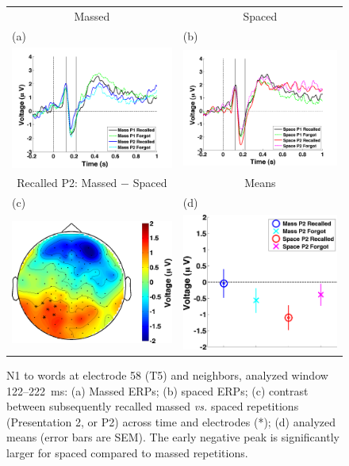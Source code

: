 \begin{figure}[hp]
  \centering
  \begin{tabular}{cc}
  Massed & Spaced \\
  \multicolumn{1}{l}{(a)} & \multicolumn{1}{l}{(b)} \\
  \includegraphics[width=.35\textwidth]{./figs/exp1/tla_single_ga_word_RgH_rc_mass_p1_word_RgH_fo_mass_p1_word_RgH_rc_mass_p2_word_RgH_fo_mass_p2_E50_E51_E57_E58_E59_E64_E65_-200_1000_legend_xylabel} &
  \includegraphics[width=.35\textwidth]{./figs/exp1/tla_single_ga_word_RgH_rc_spac_p1_word_RgH_fo_spac_p1_word_RgH_rc_spac_p2_word_RgH_fo_spac_p2_E50_E51_E57_E58_E59_E64_E65_-200_1000_legend_xylabel} \\
  Recalled P2: Massed $-$ Spaced & Means \\
  \multicolumn{1}{l}{(c)} & \multicolumn{1}{l}{(d)} \\
  \includegraphics[width=.29\textwidth]{./figs/exp1/tla_topocont_ga_word_RgH_rc_mass_p2vsword_RgH_rc_spac_p2_E50_E51_E57_E58_E59_E64_E65_122_222_-2p0_2p0_cb} &
  \includegraphics[width=.30\textwidth]{./figs/exp1/tla_line_ga_word_RgH_rc_mass_p2_word_RgH_fo_mass_p2_word_RgH_rc_spac_p2_word_RgH_fo_spac_p2_E50_E51_E57_E58_E59_E64_E65_122_222_ylabel} \\
  \end{tabular}
  \caption{N1 to words at electrode 58 (T5) and neighbors, analyzed window 122--222~ms: (a) Massed ERPs; (b) spaced ERPs; (c) contrast between subsequently recalled massed \textit{vs.} spaced repetitions (Presentation 2, or P2) across time and electrodes (*); (d) analyzed means (error bars are SEM).  The early negative peak is significantly larger for spaced compared to massed repetitions.}
  \label{fig:N1}
\end{figure}

